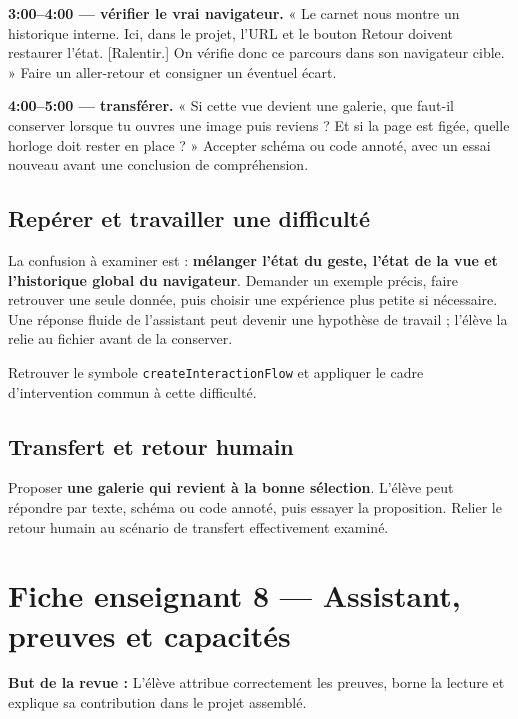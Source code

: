 \documentclass[
  canadien,
  11pt,
  a4paper,
]{report}
\begin{document}
\textbf{3:00--4:00 --- vérifier le vrai navigateur.} « Le carnet nous
montre un historique interne. Ici, dans le projet, l'URL et le bouton
Retour doivent restaurer l'état. {[}Ralentir.{]} On vérifie donc ce
parcours dans son navigateur cible. » Faire un aller-retour et consigner
un éventuel écart.

\textbf{4:00--5:00 --- transférer.} « Si cette vue devient une galerie,
que faut-il conserver lorsque tu ouvres une image puis reviens ? Et si
la page est figée, quelle horloge doit rester en place ? » Accepter
schéma ou code annoté, avec un essai nouveau avant une conclusion de
compréhension.

\section{Repérer et travailler une
difficulté}\label{repuxe9rer-et-travailler-une-difficultuxe9-6}

La confusion à examiner est : \textbf{mélanger l'état du geste, l'état
de la vue et l'historique global du navigateur}. Demander un exemple
précis, faire retrouver une seule donnée, puis choisir une expérience
plus petite si nécessaire. Une réponse fluide de l'assistant peut
devenir une hypothèse de travail ; l'élève la relie au fichier avant de
la conserver.

Retrouver le symbole \texttt{create\allowbreak{}Interaction\allowbreak{}Flow} et appliquer le
cadre d'intervention commun à cette difficulté.

\section{Transfert et retour humain}\label{transfert-et-retour-humain-6}

Proposer \textbf{une galerie qui revient à la bonne sélection}. L'élève
peut répondre par texte, schéma ou code annoté, puis essayer la
proposition. Relier le retour humain au scénario de transfert
effectivement examiné.

\chapter{Fiche enseignant 8 --- Assistant, preuves et
capacités}\label{fiche-enseignant-8-assistant-preuves-et-capacituxe9s}

\textbf{But de la revue :} L'élève attribue correctement les preuves,
borne la lecture et explique sa contribution dans le projet assemblé.
\end{document}
